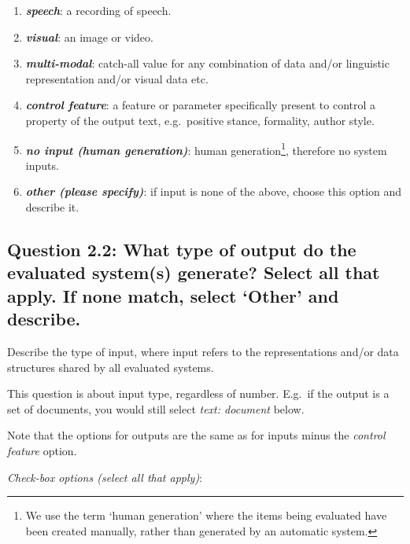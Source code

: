 \documentclass[11pt,a4paper]{article}
\newcommand{\egcvalue}[1]{\textbf{\textit{#1}}}
\begin{document}
\begin{enumerate}[itemsep=0cm,leftmargin=0.5cm,label={\small $\square$}]
            \item \egcvalue{speech}: a recording of speech.
            
            \item \egcvalue{visual}: an image or video.
            
            \item \egcvalue{multi-modal}: catch-all value for any combination of data and/or linguistic representation and/or visual data etc.
            
            \item \egcvalue{control feature}: a feature or parameter specifically present to control a property of the output text, e.g.\ positive stance, formality, author style.
            
            \item \egcvalue{no input (human generation)}: human generation\footnote{\label{human-generation}We use the term `human generation' where the items being evaluated have been created manually, rather than generated by an automatic system.}, therefore no system inputs.
            
            \item \egcvalue{other (please specify)}: if input is none of the above, choose this option and describe it. 
            
\end{enumerate}

\vspace{-.3cm}
\subsection*{Question 2.2: What type of output do the evaluated system(s) generate? Select all that apply. If none match, select `Other' and describe.}\label{sec:output}

Describe the type of input, where input refers to the representations and/or data structures shared by all evaluated systems. 

This question is about input type, regardless of number. E.g.\ if the output is a set of documents, you would still select \textit{text: document} below. 

Note that the options for outputs are the same as for inputs minus the \textit{control feature} option.


\vspace{.3cm}
\noindent\textit{Check-box options (select all that apply)}: 
\vspace{-.1cm}
\end{document}
